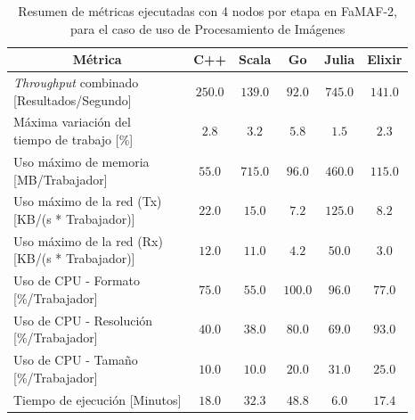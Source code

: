 \documentclass[11pt]{article}
\providecommand{\row}[1]{\parbox{150pt}{\setlength{\baselineskip}{0.2\baselineskip}\strut#1\strut}}
\newcommand{\english}[1]{\textit{#1}}
\begin{document}
\begin{table}[H]
\centering
\begin{tabular}{|l|c|c|c|c|c|}
\hline
\multicolumn{1}{|c|}{Métrica} & C++ & Scala & Go & Julia & Elixir \\ \hline
\row{\english{Throughput} combinado\\ {[}Resultados/Segundo{]}} & $250.0$ & $139.0$ & $92.0$ & $745.0$ & $141.0$ \\ \hline
\row{Máxima variación del \\ tiempo de trabajo {[}\%{]}} & $2.8$ & $3.2$ & $5.8$ & $1.5$ & $2.3$ \\ \hline
\row{Uso máximo de memoria \\ {[}MB/Trabajador{]}} & $55.0$ & $715.0$ & $96.0$ & $460.0$ & $115.0$ \\ \hline
\row{Uso máximo de la red (Tx)\\ {[}KB/(s * Trabajador){]}} & $22.0$ & $15.0$ & $7.2$ & $125.0$ & $8.2$ \\ \hline
\row{Uso máximo de la red (Rx)\\ {[}KB/(s * Trabajador){]}} & $12.0$ & $11.0$ & $4.2$ & $50.0$ & $3.0$ \\ \hline
\row{Uso de CPU - Formato \\ {[}\%/Trabajador{]}} & $75.0$ & $55.0$ & $100.0$ & $96.0$ & $77.0$ \\ \hline
\row{Uso de CPU - Resolución \\ {[}\%/Trabajador{]}} & $40.0$ & $38.0$ & $80.0$ & $69.0$ & $93.0$ \\ \hline
\row{Uso de CPU - Tamaño \\ {[}\%/Trabajador{]}} & $10.0$ & $10.0$ & $20.0$ & $31.0$ & $25.0$ \\ \hline
Tiempo de ejecución {[}Minutos{]} & $18.0$ & $32.3$ & $48.8$ & $6.0$ & $17.4$ \\ \hline
\end{tabular}
\caption{Resumen de métricas ejecutadas con 4 nodos por etapa en FaMAF-2, para el caso de uso de Procesamiento de Imágenes}
\label{tab:ip:4_workers_famaf_2}
\end{table}
\end{document}
